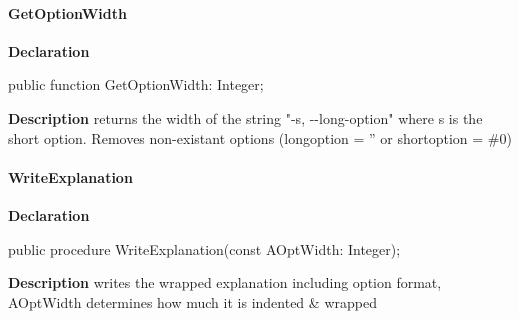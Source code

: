 \documentclass{report}
\newif\ifpdf
\begin{document}
\paragraph*{GetOptionWidth}\hspace*{\fill}

\label{PasDoc_OptionParser.TOption-GetOptionWidth}
\begin{list}{}{
\setlength{\itemindent}{0cm}
\setlength{\listparindent}{0cm}
\setlength{\leftmargin}{\evensidemargin}
\addtolength{\leftmargin}{\tmplength}
\settowidth{\labelsep}{X}
\addtolength{\leftmargin}{\labelsep}
\setlength{\labelwidth}{\tmplength}
}
\item[\textbf{Declaration}\hfill]
\ifpdf
\begin{flushleft}
\fi
\begin{ttfamily}
public function GetOptionWidth: Integer;\end{ttfamily}

\ifpdf
\end{flushleft}
\fi

\par
\item[\textbf{Description}]
returns the width of the string "{-}s, {-}{-}long{-}option" where s is the short option. Removes non{-}existant options (longoption = '' or shortoption = {\#}0)

\end{list}
\paragraph*{WriteExplanation}\hspace*{\fill}

\label{PasDoc_OptionParser.TOption-WriteExplanation}
\begin{list}{}{
\setlength{\itemindent}{0cm}
\setlength{\listparindent}{0cm}
\setlength{\leftmargin}{\evensidemargin}
\addtolength{\leftmargin}{\tmplength}
\settowidth{\labelsep}{X}
\addtolength{\leftmargin}{\labelsep}
\setlength{\labelwidth}{\tmplength}
}
\item[\textbf{Declaration}\hfill]
\ifpdf
\begin{flushleft}
\fi
\begin{ttfamily}
public procedure WriteExplanation(const AOptWidth: Integer);\end{ttfamily}

\ifpdf
\end{flushleft}
\fi

\par
\item[\textbf{Description}]
writes the wrapped explanation including option format, AOptWidth determines how much it is indented {\&} wrapped

\end{list}
\ifpdf
\end{document}
